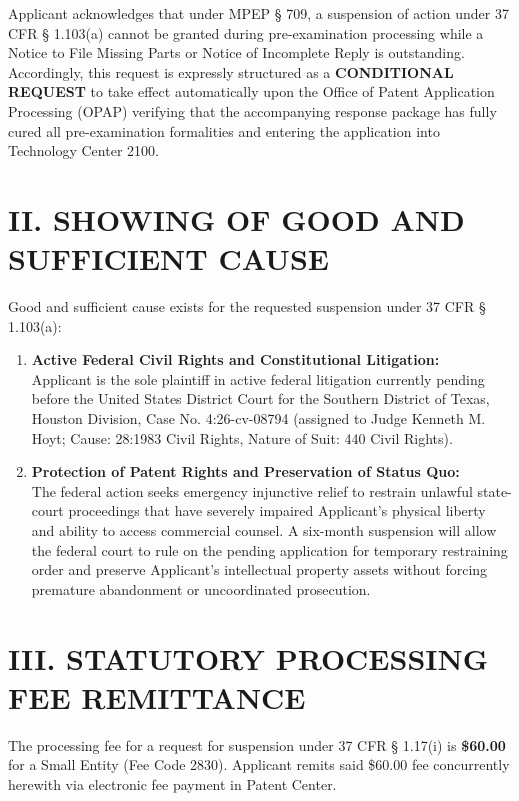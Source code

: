 \documentclass[11pt,letterpaper]{article}
\begin{document}
Applicant acknowledges that under MPEP \S{} 709, a suspension of action under 37 CFR \S{} 1.103(a) cannot be granted during pre-examination processing while a Notice to File Missing Parts or Notice of Incomplete Reply is outstanding. Accordingly, this request is expressly structured as a \textbf{CONDITIONAL REQUEST} to take effect automatically upon the Office of Patent Application Processing (OPAP) verifying that the accompanying response package has fully cured all pre-examination formalities and entering the application into Technology Center 2100.

\section*{II. SHOWING OF GOOD AND SUFFICIENT CAUSE}

Good and sufficient cause exists for the requested suspension under 37 CFR \S{} 1.103(a):
\begin{enumerate}[leftmargin=*]
    \item \textbf{Active Federal Civil Rights and Constitutional Litigation:} \\
    Applicant is the sole plaintiff in active federal litigation currently pending before the United States District Court for the Southern District of Texas, Houston Division, Case No. 4:26-cv-08794 (assigned to Judge Kenneth M. Hoyt; Cause: 28:1983 Civil Rights, Nature of Suit: 440 Civil Rights).

    \item \textbf{Protection of Patent Rights and Preservation of Status Quo:} \\
    The federal action seeks emergency injunctive relief to restrain unlawful state-court proceedings that have severely impaired Applicant's physical liberty and ability to access commercial counsel. A six-month suspension will allow the federal court to rule on the pending application for temporary restraining order and preserve Applicant's intellectual property assets without forcing premature abandonment or uncoordinated prosecution.
\end{enumerate}

\section*{III. STATUTORY PROCESSING FEE REMITTANCE}

The processing fee for a request for suspension under 37 CFR \S{} 1.17(i) is \textbf{\$60.00} for a Small Entity (Fee Code 2830). Applicant remits said \$60.00 fee concurrently herewith via electronic fee payment in Patent Center.
\end{document}
